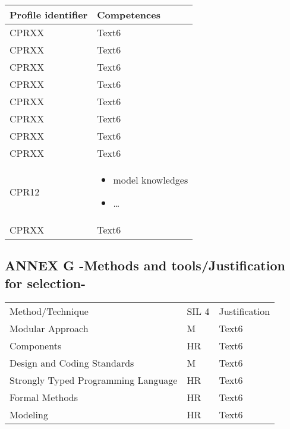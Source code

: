 \documentclass{template/openetcs_article}
\begin{document}
\begin{flushleft}
\tablefirsthead{}
\tablehead{}
\tabletail{}
\tablelasttail{}
\begin{supertabular}{|m{3cm}|m{12cm}|}
\hline
{}
Profile identifier&
Competences\\\hline
CPRXX &
Text6\\\hline
CPRXX &
Text6\\\hline
CPRXX &
Text6\\\hline
CPRXX &
Text6\\\hline
CPRXX &
Text6\\\hline
CPRXX &
Text6\\\hline
CPRXX &
Text6\\\hline
CPRXX &
Text6\\\hline
CPR12 &
\begin{itemize}
\item model knowledges
\item {\dots}
\end{itemize}\\\hline
CPRXX &
Text6\\\hline
\end{supertabular}
\end{flushleft}

\subsection{ANNEX G -Methods and tools/Justification for selection-}

\begin{flushleft}
\begin{supertabular}{|m{6cm}|m{2cm}|m{7cm}|}
\hline
{}
 \\\hline
{}
Method/Technique &
SIL 4 &
Justification\\\hline
Modular Approach &
M &
Text6\\\hline
Components &
HR &
Text6\\\hline
Design and Coding Standards &
M &
Text6\\\hline
Strongly Typed Programming
Language &
HR &
Text6\\\hline
Formal Methods &
HR &
Text6\\\hline
Modeling&
HR &
Text6\\\hline
\end{supertabular}
\end{flushleft}
\end{document}
